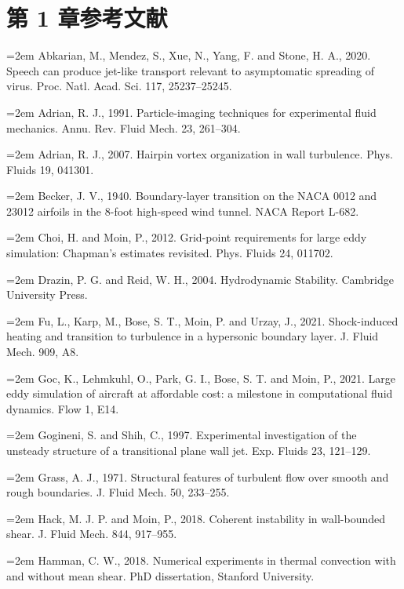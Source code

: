 \documentclass[12pt,a4paper,openany,fontset=none]{ctexbook}
\begin{document}
\section*{第 1 章参考文献}
\par\hangindent=2em Abkarian, M., Mendez, S., Xue, N., Yang, F. and Stone, H. A., 2020. Speech can produce jet-like transport relevant to asymptomatic spreading of virus. Proc. Natl. Acad. Sci. 117, 25237–25245.
\par\hangindent=2em Adrian, R. J., 1991. Particle-imaging techniques for experimental fluid mechanics. Annu. Rev. Fluid Mech. 23, 261–304.
\par\hangindent=2em Adrian, R. J., 2007. Hairpin vortex organization in wall turbulence. Phys. Fluids 19, 041301.
\par\hangindent=2em Becker, J. V., 1940. Boundary-layer transition on the NACA 0012 and 23012 airfoils in the 8-foot high-speed wind tunnel. NACA Report L-682.
\par\hangindent=2em Choi, H. and Moin, P., 2012. Grid-point requirements for large eddy simulation: Chapman’s estimates revisited. Phys. Fluids 24, 011702.
\par\hangindent=2em Drazin, P. G. and Reid, W. H., 2004. Hydrodynamic Stability. Cambridge University Press.
\par\hangindent=2em Fu, L., Karp, M., Bose, S. T., Moin, P. and Urzay, J., 2021. Shock-induced heating and transition to turbulence in a hypersonic boundary layer. J. Fluid Mech. 909, A8.
\par\hangindent=2em Goc, K., Lehmkuhl, O., Park, G. I., Bose, S. T. and Moin, P., 2021. Large eddy simulation of aircraft at affordable cost: a milestone in computational fluid dynamics. Flow 1, E14.
\par\hangindent=2em Gogineni, S. and Shih, C., 1997. Experimental investigation of the unsteady structure of a transitional plane wall jet. Exp. Fluids 23, 121–129.
\par\hangindent=2em Grass, A. J., 1971. Structural features of turbulent flow over smooth and rough boundaries. J. Fluid Mech. 50, 233–255.
\par\hangindent=2em Hack, M. J. P. and Moin, P., 2018. Coherent instability in wall-bounded shear. J. Fluid Mech. 844, 917–955.
\par\hangindent=2em Hamman, C. W., 2018. Numerical experiments in thermal convection with and without mean shear. PhD dissertation, Stanford University.
\end{document}
